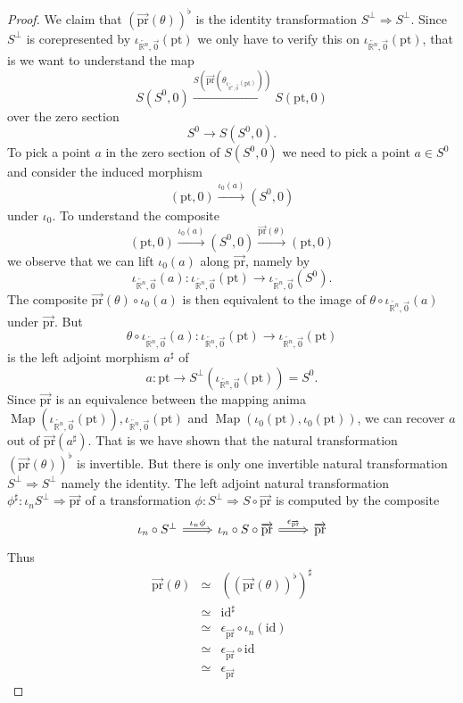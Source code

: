 \documentclass{article}
\newcommand{\xto}{\xrightarrow}
\newcommand{\R}{\mathbb{R}} %
\newcommand{\pt}{\mathrm{pt}}
\newcommand{\pr}{\mathrm{pr}}
\newcommand{\id}{\mathrm{id}}
\newcommand{\iotarnzero}{\iota_{\overleftarrow{\R^n},\overrightarrow{0}}}
\DeclareMathOperator{\Map}{Map}
\begin{document}
\begin{proof}
    We claim that $(\overrightarrow{\pr}(\theta))^\flat$ is the identity transformation $S^\perp \Rightarrow S^\perp$.
    Since $S^\perp$ is corepresented by $\iotarnzero(\pt)$ we only have to verify this on $\iotarnzero(\pt)$, that is 
    we want to understand the map
    \[
    S(S^0, 0) \xrightarrow{S(\overrightarrow{\pr}(\theta_{\iotarnzero(\pt)}))} S(\pt, 0)
    \]
    over the zero section 
    \[
    S^0 \to S(S^0, 0).
    \]
    To pick a point $a$ in the zero section of $S(S^0, 0)$ we need to pick a point $a \in S^0$
    and consider the induced morphism 
    \[
        (\pt,0) \xto{\iota_0(a)} (S^0,0)
    \]
    under $\iota_0$.
    To understand the composite 
    \[
        (\pt,0) \xto{\iota_0(a)} (S^0,0) \xto{\overrightarrow{\pr}(\theta)} (\pt, 0)
    \]
    we observe that we can lift $\iota_0(a)$ along $\overrightarrow{\pr}$, namely by 
    \[
      \iotarnzero(a) \colon \iotarnzero(\pt) \to \iotarnzero(S^0).  
    \]
    The composite $\overrightarrow{\pr}(\theta) \circ \iota_0(a)$ is then equivalent to the image 
    of $\theta \circ \iotarnzero(a)$ under $\overrightarrow{\pr}$.
    But 
    \[
        \theta \circ \iotarnzero(a) \colon \iotarnzero(\pt) \to \iotarnzero(\pt) 
    \]
    is the left adjoint morphism $a^\sharp$ of 
    \[
      a \colon \pt \to S^\perp(\iotarnzero(\pt)) = S^0.  
    \]
    Since $\overrightarrow{\pr}$ is an equivalence between the mapping anima $\Map(\iotarnzero(\pt)), \iotarnzero(\pt)$ 
    and $\Map(\iota_0(\pt), \iota_0(\pt))$, we can recover $a$ out of $\overrightarrow{\pr}(a^\sharp)$.
    That is we have shown that the natural transformation $(\overrightarrow{\pr}(\theta))^\flat$ is invertible. 
    But there is only one invertible natural transformation $S^\perp \Rightarrow S^\perp$ namely the identity.
    The left adjoint natural transformation $\phi^\sharp \colon \iota_n S^\perp \Rightarrow \overrightarrow{\pr}$ of
    a transformation $\phi \colon S^\perp \Rightarrow S \circ \overrightarrow{\pr}$ is computed by the composite 
    \[\begin{tikzcd}
        {\iota_n\circ S^\perp} & {\iota_n \circ S \circ \overrightarrow{\pr}} & {\overrightarrow{\pr}}
        \arrow["{\iota_n \phi}", Rightarrow, from=1-1, to=1-2]
        \arrow["{\epsilon_{\overrightarrow{\pr}}}", Rightarrow, from=1-2, to=1-3]
    \end{tikzcd}\]
    Thus 
    \begin{eqnarray*}
        \overrightarrow{\pr}(\theta) & \simeq & ((\overrightarrow{\pr}(\theta))^\flat)^\sharp \\
        & \simeq & \id^\sharp \\
        & \simeq & \epsilon_{\overrightarrow{\pr}} \circ \iota_n(\id) \\
        & \simeq & \epsilon_{\overrightarrow{\pr}} \circ \id \\ 
        & \simeq & \epsilon_{\overrightarrow{\pr}}
    \end{eqnarray*}  
\end{proof}
\end{document}
